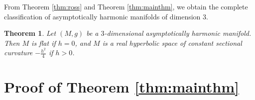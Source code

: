 \documentclass[12pt,a4paper]{amsart}
\newtheorem{Thm}{Theorem}[section]
\theoremstyle{definition}
\theoremstyle{remark}
\newcommand \<{\langle}
\renewcommand \>{\rangle}
\begin{document}



From Theorem \ref{thm:ross} and Theorem  \ref{thm:mainthm}, we obtain the complete classification of asymptotically harmonic manifolds of dimension $3$.

\begin{Thm}\label{class}
Let $(M,g)$ be a $3$-dimensional asymptotically harmonic manifold. Then $M$ is flat if $h=0$, and $M$ is a real hyperbolic space of constant sectional curvature $-\frac{h^2}{4}$ if $h>0$.
\end{Thm}


\section{Proof of Theorem \ref{thm:mainthm} }
\end{document}
